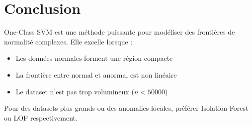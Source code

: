 \documentclass[a4paper,11pt]{article}
\begin{document}
\section{Conclusion}

One-Class SVM est une méthode puissante pour modéliser des frontières de normalité complexes. Elle excelle lorsque :
\begin{itemize}
    \item Les données normales forment une région compacte
    \item La frontière entre normal et anormal est non linéaire
    \item Le dataset n'est pas trop volumineux ($n < 50000$)
\end{itemize}

Pour des datasets plus grands ou des anomalies locales, préférer Isolation Forest ou LOF respectivement.
\end{document}
